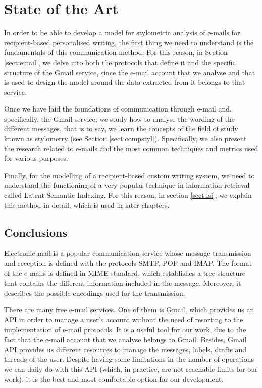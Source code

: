 \chapter{State of the Art}
\label{cap:estadoDeLaCuestion}

In order to be able to develop a model for stylometric analysis of e-mails for recipient-based personalised writing, the first thing we need to understand is the fundamentals of this communication method. For this reason, in Section \ref{sect:email}, we delve into both the protocols that define it and the specific structure of the Gmail service, since the e-mail account that we analyse and that is used to design the model around the data extracted from it belongs to that service.

Once we have laid the foundations of communication through e-mail and, specifically, the Gmail service, we study how to analyse the wording of the different messages, that is to say, we learn the concepts of the field of study known as stylometry (see Section \ref{sect:compstyl}). Specifically, we also present the research related to e-mails and the most common techniques and metrics used for various purposes.

Finally, for the modelling of a recipient-based custom writing system, we need to understand the functioning of a very popular technique in information retrieval called Latent Semantic Indexing. For this reason, in section \ref{sect:lsi}, we explain this method in detail, which is used in later chapters.





\section{Conclusions}
Electronic mail is a popular communication service whose message transmission and reception is defined with the protocols SMTP, POP and IMAP. The format of the e-mails is defined in MIME standard, which establishes a tree structure that contains the different information included in the message. Moreover, it describes the possible encodings used for the transmission.

There are many free e-mail services. One of them is Gmail, which provides us an API in order to manage a user's account without the need of resorting to the implementation of e-mail protocols. It is a useful tool for our work, due to the fact that the e-mail account that we analyse belongs to Gmail. Besides, Gmail API provides us different resources to manage the messages, labels, drafts and threads of the user. Despite having some limitations in the number of operations we can daily do with this API (which, in practice, are not reachable limits for our work), it is the best and most comfortable option for our development.

